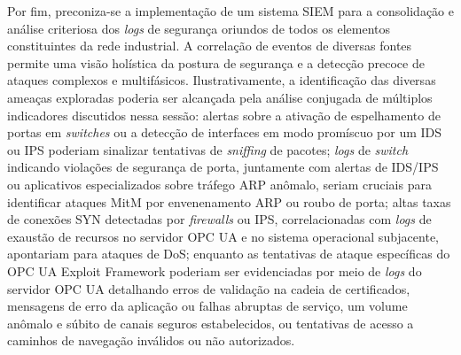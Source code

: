 
        Por fim, preconiza-se a implementação de um sistema SIEM para a consolidação e análise criteriosa dos \textit{logs} de segurança oriundos de todos os elementos constituintes da rede industrial. A correlação de eventos de diversas fontes permite uma visão holística da postura de segurança e a detecção precoce de ataques complexos e multifásicos.
        Ilustrativamente, a identificação das diversas ameaças exploradas poderia ser alcançada pela análise conjugada de múltiplos indicadores discutidos nessa sessão: alertas sobre a ativação de espelhamento de portas em \textit{switches} ou a detecção de interfaces em modo promíscuo por um IDS ou IPS poderiam sinalizar tentativas de \textit{sniffing} de pacotes; \textit{logs} de \textit{switch} indicando violações de segurança de porta, juntamente com alertas de IDS/IPS ou aplicativos especializados sobre tráfego ARP anômalo, seriam cruciais para identificar ataques MitM por envenenamento ARP ou roubo de porta; altas taxas de conexões SYN detectadas por \textit{firewalls} ou IPS, correlacionadas com \textit{logs} de exaustão de recursos no servidor OPC UA e no sistema operacional subjacente, apontariam para ataques de DoS; enquanto as tentativas de ataque específicas do OPC UA Exploit Framework poderiam ser evidenciadas por meio de \textit{logs} do servidor OPC UA detalhando erros de validação na cadeia de certificados, mensagens de erro da aplicação ou falhas abruptas de serviço, um volume anômalo e súbito de canais seguros estabelecidos, ou tentativas de acesso a caminhos de navegação inválidos ou não autorizados.
